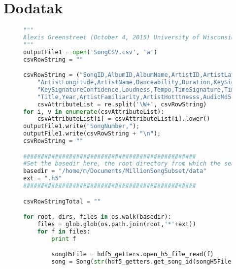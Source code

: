 \section{Dodatak}
\label{sec:DodatakIzvlacenje}

\begin{figure}
\lstset{style=mystyle}
\begin{lstlisting}[language=Python, basicstyle=\footnotesize]
"""
Alexis Greenstreet (October 4, 2015) University of Wisconsin-Madison
"""
outputFile1 = open('SongCSV.csv', 'w')
csvRowString = ""

csvRowString = ("SongID,AlbumID,AlbumName,ArtistID,ArtistLatitude,ArtistLocation,"+
    "ArtistLongitude,ArtistName,Danceability,Duration,KeySignature,"+
    "KeySignatureConfidence,Loudness,Tempo,TimeSignature,TimeSignatureConfidence,"+
    "Title,Year,ArtistFamiliarity,ArtistHotttnesss,AudioMd5,EndOfFadeIn," + "Energy,Key,KeyConfidence,Mode,ModeConfidence,Release,SongHotttness,StartOfFadeOut,TrackId,Genre")
	csvAttributeList = re.split('\W+', csvRowString)
for i, v in enumerate(csvAttributeList):
    csvAttributeList[i] = csvAttributeList[i].lower()
outputFile1.write("SongNumber,");
outputFile1.write(csvRowString + "\n");
csvRowString = ""

#################################################
#Set the basedir here, the root directory from which the search
basedir = "/home/m/Documents/MillionSongSubset/data"
ext = ".h5"
#################################################

csvRowStringTotal = ""

for root, dirs, files in os.walk(basedir):
    files = glob.glob(os.path.join(root,'*'+ext))
    for f in files:
        print f

        songH5File = hdf5_getters.open_h5_file_read(f)
        song = Song(str(hdf5_getters.get_song_id(songH5File)))


\end{lstlisting}
\end{figure}
